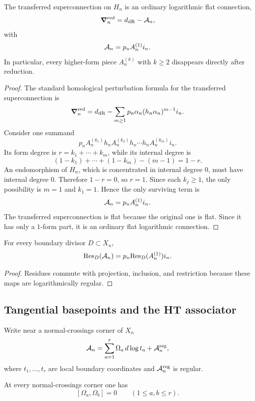\begin{theorem}%
The transferred superconnection on $H_n$ is an ordinary logarithmic flat connection,
\[
 \boldsymbol{\nabla}_n^{\mathrm{red}} = d_{\mathrm{dR}}-\mathcal A_n,
\]
with
\[
 \mathcal A_n = p_nA_n^{(1)}i_n.
\]
In particular, every higher-form piece $A_n^{(k)}$ with $k\ge 2$ disappears directly after reduction.
\end{theorem}

\begin{proof}
The standard homological perturbation formula for the transferred superconnection is
\[
 \boldsymbol{\nabla}_n^{\mathrm{red}}
 =
 d_{\mathrm{dR}}-\sum_{m\ge 1} p_n\alpha_n(h_n\alpha_n)^{m-1}i_n.
\]
Consider one summand
\[
 p_n A_n^{(k_1)} h_n A_n^{(k_2)} h_n \cdots h_n A_n^{(k_m)} i_n.
\]
Its form degree is $r=k_1+\cdots+k_m$, while its internal degree is
\[
 (1-k_1)+\cdots+(1-k_m)-(m-1)=1-r.
\]
An endomorphism of $H_n$, which is concentrated in internal degree $0$, must have internal degree $0$. Therefore $1-r=0$, so $r=1$. Since each $k_j\ge 1$, the only possibility is $m=1$ and $k_1=1$. Hence the only surviving term is
\[
 \mathcal A_n = p_nA_n^{(1)}i_n.
\]
The transferred superconnection is flat because the original one is flat. Since it has only a $1$-form part, it is an ordinary flat logarithmic connection.
\end{proof}

\begin{corollary}%
For every boundary divisor $D\subset X_n$,
\[
 \mathrm{Res}_D(\mathcal A_n)=p_n\mathrm{Res}_D(A_n^{(1)})i_n.
\]
\end{corollary}

\begin{proof}
Residues commute with projection, inclusion, and restriction because these maps are logarithmically regular.
\end{proof}

\subsection{Tangential basepoints and the HT associator}
Write near a normal-crossings corner of $X_n$
\[
 \mathcal A_n = \sum_{a=1}^r \Omega_a\,d\log t_a + \mathcal A_n^{\mathrm{reg}},
\]
where $t_1,\dots,t_r$ are local boundary coordinates and $\mathcal A_n^{\mathrm{reg}}$ is regular.

\begin{lemma}%
At every normal-crossings corner one has
\[
 [\Omega_a,\Omega_b]=0\qquad (1\le a,b\le r).
\]
\end{lemma}

